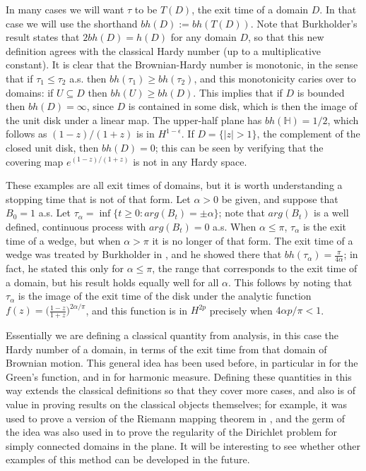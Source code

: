 \documentclass[a4paper, oneside, 12pt]{amsart}
\newcommand{\HH}{\mathbb{H}}
\begin{document}
In many cases we will want $\tau$ to be $T(D)$, the exit time of a domain $D$. In that case we will use the shorthand $bh(D) := bh(T(D))$. Note that Burkholder's result states that $2bh(D) = h(D)$ for any domain $D$, so that this new definition agrees with the classical Hardy number (up to a multiplicative constant). It is clear that the Brownian-Hardy number is monotonic, in the sense that if $\tau_1 \leq \tau_2$ a.s. then $bh(\tau_1) \geq bh(\tau_2)$, and this monotonicity caries over to domains: if $U \subseteq D$ then $bh(U) \geq bh(D)$. This implies that if $D$ is bounded then $bh(D) = \infty$, since $D$ is contained in some disk, which is then the image of the unit disk under a linear map. The upper-half plane has $bh(\HH) = 1/2$, which follows as 
$(1-z)/(1+z)$ is in $H^{1-\epsilon}$. If $D=\{|z|>1\}$, the complement of the closed unit disk, then $bh(D) = 0$; this can be seen by verifying that the covering map $e^{(1-z)/(1+z)}$ is not in any Hardy space. 

These examples are all exit times of domains, but it is worth understanding a stopping time that is not of that form. Let $\alpha>0$ be given, and suppose that $B_0 = 1$ a.s. Let $\tau_\alpha = \inf\{t \geq 0: arg(B_t)= \pm \alpha\}$; note that $arg(B_t)$ is a well defined, continuous process with $arg(B_t) = 0$ a.s. When $\alpha \leq \pi$, $\tau_\alpha$ is the exit time of a wedge, but when $\alpha > \pi$ it is no longer of that form. The exit time of a wedge was treated by Burkholder in \cite{burk}, and he showed there that $bh(\tau_\alpha) = \frac{\pi}{4\alpha}$; in fact, he stated this only for $\alpha \leq \pi$, the range that corresponds to the exit time of a domain, but his result holds equally well for all $\alpha$. This follows by noting that $\tau_\alpha$ is the image of the exit time of the disk under the analytic function $f(z) = \Big(\frac{1-z}{1+z}\Big)^{2\alpha/\pi}$, and this function is in $H^{2p}$ precisely when $4\alpha p/\pi < 1$.

Essentially we are defining a classical quantity from analysis, in this case the Hardy number of a domain, in terms of the exit time from that domain of Brownian motion. This general idea has been used before, in particular in \cite{markowsky2017planar} for the Green's function, and in \cite{Markowsky_2018} for harmonic measure. Defining these quantities in this way extends the classical definitions so that they cover more cases, and also is of value in proving results on the classical objects themselves; for example, it was used to prove a version of the Riemann mapping theorem in \cite{markowsky2017planar}, and the germ of the idea was also used in \cite{markowsky2018remark} to prove the regularity of the Dirichlet problem for simply connected domains in the plane. It will be interesting to see whether other examples of this method can be developed in the future.
\end{document}
